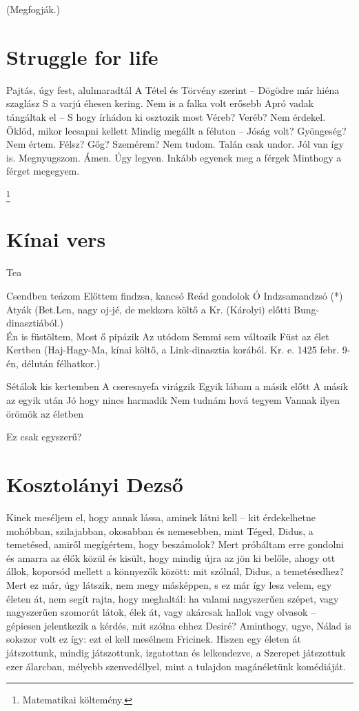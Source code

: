 \documentclass[3p,times]{elsarticle}
\begin{document}
\begin{center}
(Megfogják.)\cite{karinthy_dana_1912}
\end{center}

\section{Struggle for life}

Pajtás, úgy fest, alulmaradtál
A Tétel és Törvény szerint –
Dögödre már hiéna szaglász
S a varjú éhesen kering.
Nem is a falka volt erősebb
Apró vadak tángáltak el –
S hogy írhádon ki osztozik most
Véreb? Veréb? Nem érdekel.
Öklöd, mikor lecsapni kellett
Mindig megállt a féluton –
Jóság volt? Gyöngeség? Nem értem.
Félsz? Gőg? Szemérem? Nem tudom.
Talán csak undor. Jól van így is.
Megnyugszom. Ámen. Úgy legyen.
Inkább egyenek meg a férgek
Minthogy a férget megegyem. \cite{karinthy_struggle_1938}

\footnote{Matematikai költemény.}

\section{Kínai vers}

Tea

Csendben teázom
Előttem findzsa, kancsó
Reád gondolok
Ó Indzsamandzsó (*)
\\
Atyák
(Bet.Len, nagy oj-jé, de mekkora költő a Kr. (Károlyi) előtti Bung-dinasztiából.)
\\
Én is füstöltem,
Most ő pipázik
Az utódom
Semmi sem változik
Füst az élet
\\
Kertben
(Haj-Hagy-Ma, kínai költő, a Link-dinasztia korából. Kr. e. 1425 febr. 9-én, délután félhatkor.)

Sétálok kis kertemben
A cseresnyefa virágzik
Egyik lábam a másik előtt
A másik az egyik után
Jó hogy nincs harmadik
Nem tudnám hová tegyem
Vannak ilyen örömök az életben

Ez csak egyszerű? \cite{karinthy_kinai_nodate}

\section{Kosztolányi Dezső}

Kinek meséljem el, hogy annak lássa, aminek látni kell – kit érdekelhetne mohóbban, szilajabban, okosabban
és nemesebben, mint Téged, Didus, a temetésed, amiről megígértem, hogy beszámolok? Mert próbáltam erre gondolni és
amarra az élők közül és kisült, hogy mindig újra az jön ki belőle, ahogy ott állok, koporsód mellett a könnyezők között: 
mit szólnál, Didus, a temetésedhez? Mert ez már, úgy látszik, nem megy másképpen, s ez már így lesz velem, egy életen át, 
nem segít rajta, hogy meghaltál: ha valami nagyszerűen szépet, vagy nagyszerűen szomorút látok, élek át, vagy akárcsak hallok
vagy olvasok – gépiesen jelentkezik a kérdés, mit szólna ehhez Desiré? Aminthogy, ugye, Nálad is sokszor volt ez így: 
ezt el kell mesélnem Fricinek. Hiszen egy életen át játszottunk, mindig játszottunk, izgatottan és lelkendezve,
a Szerepet játszottuk ezer álarcban, mélyebb szenvedéllyel, mint a tulajdon magánéletünk komédiáját.\cite{karinthy_kosztolanyi_1936}





\end{document}
